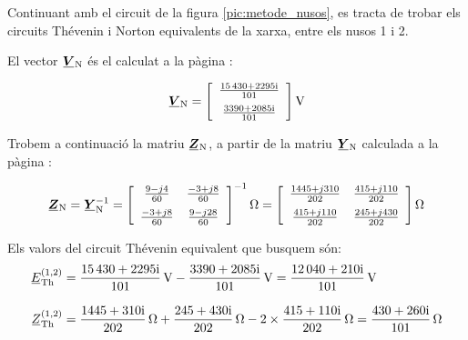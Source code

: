 \begin{exemple}\label{ex:XarxaThevenin}
	\addcontentsxms{\XarxaThevenin}
    Continuant amb el circuit de la figura \vref{pic:metode_nusos}, es
    tracta de trobar els circuits Thévenin i Norton equivalents de la
    xarxa, entre els nusos 1 i 2.

    El vector $\mcmplx{V}\ped{N}$ és el calculat a la pàgina \pageref{eq:vn-exemp}:

    \[
      \mcmplx{V}\ped{N} =
      \begin{bmatrix}\begin{array}{c} 
            \frac{\complexnum{15430 + j 2295}}{101} \\[2mm]
            \frac{\complexnum{3390 + j 2085}}{101}
      \end{array}\end{bmatrix}\unit{V}
   \]

    Trobem a continuació la matriu $\mcmplx{Z}\ped{N}$, a partir de la matriu $\mcmplx{Y}\ped{N}$
    calculada a la pàgina \pageref{eq:yn}:

    \[
       \mcmplx{Z}\ped{N} =  \mcmplx{Y}\ped{N}^{-1} =
       \begin{bmatrix}\begin{array}{cc} 
                \frac{9 - j 4}{60} & \frac{-3 + j 8}{60} \\[2mm]
                \frac{-3 + j 8}{60} & \frac{9 - j 28}{60}
       \end{array}\end{bmatrix}^{-1}\unit{\ohm} =
       \begin{bmatrix}\begin{array}{cc} 
             \frac{1445 + j 310}{202} & \frac{415 + j 110}{202} \\[2mm]
             \frac{415 + j 110}{202} & \frac{245 + j 430}{202}
       \end{array}\end{bmatrix}\unit{\ohm}
    \]

    Els valors del circuit Thévenin equivalent que busquem són:
    \begin{align*}
       \cmplx{E}\ped{Th}^{(1,2)} &= \frac{\complexnum{15430+j2295}}{101}\,\unit{V} - \frac{\complexnum{3390+j2085}}{101}\,\unit{V} =
       \frac{\complexnum{12040+j210}}{101}\,\unit{V} \\[2ex]
       \cmplx{Z}\ped{Th}^{(1,2)} &= \frac{\complexnum{1445+j310}}{202}\,\unit{\ohm} + \frac{\complexnum{245+j430}}{202}\,\unit{\ohm} -
       2\times\frac{\complexnum{415+j110}}{202}\,\unit{\ohm} = \frac{\complexnum{430+j260}}{101}\,\unit{\ohm}
    \end{align*}


\end{exemple}

